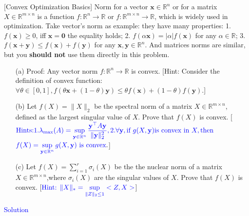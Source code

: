 \item {} [Convex Optimization Basics] Norm for a vector $\mathbf{x}\in\mathbb{R}^n$ or for a matrix $X\in\mathbb{R}^{m\times n}$ is a function $f:\mathbb{R}^{n}\rightarrow\mathbb{R}$ or $f:\mathbb{R}^{m\times n}\rightarrow\mathbb{R}$, which is widely used in optimization. Take vector's norm as example: they have many properties: 1. $f(\mathbf{x})\geq 0$, iff $\mathbf{x}=\mathbf{0}$ the equality holds; 2. $f(\alpha\mathbf{x})=|\alpha| f(\mathbf{x})$ for any $\alpha\in\mathbb{R}$; 3. $f(\mathbf{x}+\mathbf{y})\leq f(\mathbf{x})+f(\mathbf{y})$ for any $\mathbf{x},\mathbf{y}\in\mathbb{R}^n$. And matrices norms are similar, but you \textbf{should not} use them directly in this problem.
\begin{itemize}
    \item[(a)] Proof: Any vector norm $f:\mathbb{R}^{n}\rightarrow\mathbb{R}$ is convex. [Hint: Consider the definition of convex function: $\forall\theta\in[0,1], f(\theta\mathbf{x}+(1-\theta)\mathbf{y})\leq \theta f(\mathbf{x})+(1-\theta)f(\mathbf{y})$.] ~
    \item[(b)] Let $f(X) = \|X\|_2$ be the spectral norm of a matrix $X \in \mathbb{R}^{m \times n}$, defined as the largest singular value of $X$. Prove that $f(X)$ is convex. [$\textcolor{blue}{\text{Hints:} 1. \lambda_{\max}(A)=\sup\limits_{\mathbf{y}\in\mathbb{R}^n}\dfrac{\mathbf{y}^{\top}A\mathbf{y}}{\|\mathbf{y}\|_2^2}, 2. \forall\mathbf{y}, \text{if } g(X,\mathbf{y}) \text{is convex in } X, \text{then }}$ $\textcolor{blue}{f(X)=\sup\limits_{\mathbf{y}\in\mathbb{R}^n}g(X,\mathbf{y}) \text{ is convex}}.$] 
    \item[(c)] Let $f(X) = \sum\limits_{i=1}^{r} \sigma_i(X)$ be the the nuclear norm of  a matrix $X \in \mathbb{R}^{m \times n}$,where $\sigma_i(X)$ are the singular values of $X$. Prove that $f(X)$ is convex. [$\textcolor{blue}{\text{Hint: } \|X\|_* = \sup\limits_{\|Z\|_2 \leq 1} <Z,X>}$] 
\end{itemize}

\textcolor{blue}{Solution} \\






\newpage